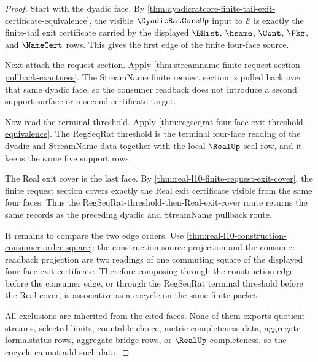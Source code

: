 \begin{proof}
Start with the dyadic face. By \autoref{thm:dyadicratcore-finite-tail-exit-certificate-equivalence}, the visible $\DyadicRatCoreUp$ input to $\mathcal E$ is exactly the finite-tail exit certificate carried by the displayed $\BHist$, $\hsame$, $\Cont$, $\Pkg$, and $\NameCert$ rows. This gives the first edge of the finite four-face source.

Next attach the request section. Apply \autoref{thm:streamname-finite-request-section-pullback-exactness}. The StreamName finite request section is pulled back over that same dyadic face, so the consumer readback does not introduce a second support surface or a second certificate target.

Now read the terminal threshold. Apply \autoref{thm:regseqrat-four-face-exit-threshold-equivalence}. The RegSeqRat threshold is the terminal four-face reading of the dyadic and StreamName data together with the local $\RealUp$ seal row, and it keeps the same five support rows.

The Real exit cover is the last face. By \autoref{thm:real-l10-finite-request-exit-cover}, the finite request section covers exactly the Real exit certificate visible from the same four faces. Thus the RegSeqRat-threshold-then-Real-exit-cover route returns the same records as the preceding dyadic and StreamName pullback route.

It remains to compare the two edge orders. Use \autoref{thm:real-l10-construction-consumer-order-square}: the construction-source projection and the consumer-readback projection are two readings of one commuting square of the displayed four-face exit certificate. Therefore composing through the construction edge before the consumer edge, or through the RegSeqRat terminal threshold before the Real cover, is associative as a cocycle on the same finite packet.

All exclusions are inherited from the cited faces. None of them exports quotient streams, selected limits, countable choice, metric-completeness data, aggregate formalstatus rows, aggregate bridge rows, or $\RealUp$ completeness, so the cocycle cannot add such data.
\end{proof}

